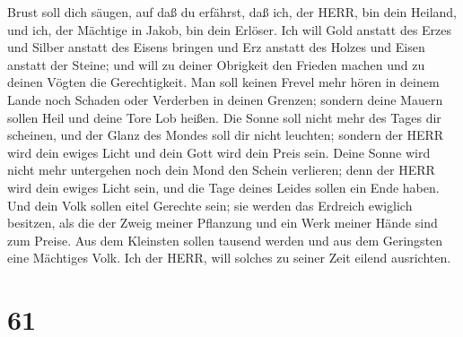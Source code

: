 Brust soll dich säugen, auf daß du erfährst, daß ich, der HERR, bin dein
Heiland, und ich, der Mächtige in Jakob, bin dein Erlöser. 
Ich will Gold anstatt des Erzes und Silber anstatt des Eisens bringen
und Erz anstatt des Holzes und Eisen anstatt der Steine; und will zu
deiner Obrigkeit den Frieden machen und zu deinen Vögten die
Gerechtigkeit.  Man soll keinen Frevel mehr hören in deinem
Lande noch Schaden oder Verderben in deinen Grenzen; sondern deine
Mauern sollen Heil und deine Tore Lob heißen.  Die Sonne
soll nicht mehr des Tages dir scheinen, und der Glanz des Mondes soll
dir nicht leuchten; sondern der HERR wird dein ewiges Licht und dein
Gott wird dein Preis sein.  Deine Sonne wird nicht mehr
untergehen noch dein Mond den Schein verlieren; denn der HERR wird dein
ewiges Licht sein, und die Tage deines Leides sollen ein Ende haben.
 Und dein Volk sollen eitel Gerechte sein; sie werden das
Erdreich ewiglich besitzen, als die der Zweig meiner Pflanzung und ein
Werk meiner Hände sind zum Preise.  Aus dem Kleinsten
sollen tausend werden und aus dem Geringsten eine Mächtiges Volk. Ich
der HERR, will solches zu seiner Zeit eilend ausrichten.

\hypertarget{section-60}{%
\section{61}\label{section-60}}

